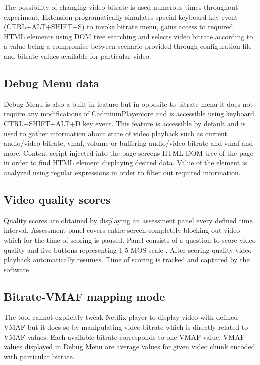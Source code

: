         The possibility of changing video bitrate is used numerous times throughout experiment. 
        Extension programatically simulates special keyboard key event (CTRL+ALT+SHIFT+S) to invoke bitrate menu, gains access to required HTML elements using DOM tree searching and selects video bitrate according to a value being a compromise between scenario provided through configuration file and bitrate values available for particular video. 

    
    \subsection{Debug Menu data}
        Debug Menu is also a built-in feature but in opposite to bitrate menu it does not require any modifications of CadmiumPlayercore and is accessible using keyboard CTRL+SHIFT+ALT+D key event.
        This feature is accessible by default and is used to gather information about state of video playback such as current audio/video bitrate, vmaf, volume or buffering audio/video bitrate and vmaf and more. Content script injected into the page screens HTML DOM tree of the page in order to find HTML element displaying desired data. Value of the element is analyzed using regular expressions in order to filter out required information.

        
    \subsection{Video quality scores}
        Quality scores are obtained by displaying an assessment panel every defined time interval. Assessment panel covers entire screen completely blocking out video which for the time of scoring is paused. Panel consists of a question to score video quality and five buttons representing 1-5 MOS scale \cite{P.800}. After scoring quality video playback automatically resumes. Time of scoring is tracked and captured by the software.
    
    \subsection{Bitrate-VMAF mapping mode}
        The tool cannot explicitly tweak Netflix player to display video with defined VMAF but it does so by manipulating video bitrate which is directly related to VMAF values. Each available bitrate corresponds to one VMAF value. VMAF values displayed in Debug Menu are average values for given video chunk encoded with particular bitrate.
    
